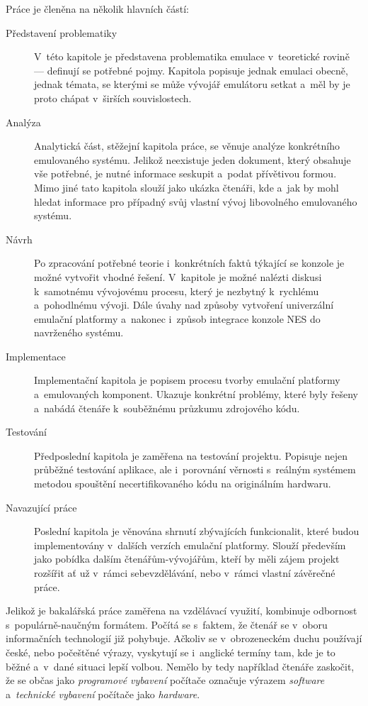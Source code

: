 Práce je členěna na několik hlavních částí:
\begin{description}
	\item[Představení problematiky] V~této kapitole je představena problematika emulace v~teoretické rovině --- definují se potřebné pojmy. Kapitola popisuje jednak emulaci obecně, jednak témata, se kterými se může vývojář emulátoru setkat a~měl by je proto chápat v~širších souvislostech.
	\item[Analýza] Analytická část, stěžejní kapitola práce, se věnuje analýze konkrétního emulovaného systému. Jelikož neexistuje jeden dokument, který obsahuje vše potřebné, je nutné informace seskupit a~podat přívětivou formou. Mimo jiné tato kapitola slouží jako ukázka čtenáři, kde a~jak by mohl hledat informace pro případný svůj vlastní vývoj libovolného emulovaného systému.
	\item[Návrh] Po zpracování potřebné teorie i~konkrétních faktů týkající se konzole je možné vytvořit vhodné řešení. V~kapitole je možné nalézti diskusi k~samotnému vývojovému procesu, který je nezbytný k~rychlému a~pohodlnému vývoji. Dále úvahy nad způsoby vytvoření univerzální emulační platformy a~nakonec i~způsob integrace konzole NES do navrženého systému.
	\item[Implementace] Implementační kapitola je popisem procesu tvorby emulační platformy a~emulovaných komponent. Ukazuje konkrétní problémy, které byly řešeny a~nabádá čtenáře k~souběžnému průzkumu zdrojového kódu.
	\item[Testování] Předposlední kapitola je zaměřena na testování projektu. Popisuje nejen průběžné testování aplikace, ale i~porovnání věrnosti s~reálným systémem metodou spouštění necertifikovaného kódu na originálním hardwaru.
	\item[Navazující práce] Poslední kapitola je věnována shrnutí zbývajících funkcionalit, které budou implementovány v~dalších verzích emulační platformy. Slouží především jako pobídka dalším čtenářům-vývojářům, kteří by měli zájem projekt rozšířit ať už v~rámci sebevzdělávání, nebo v~rámci vlastní závěrečné práce.
\end{description}

\begin{note*}[Terminologie]
	Jelikož je bakalářská práce zaměřena na vzdělávací využití, kombinuje odbornost s~populárně-naučným formátem. Počítá se s~faktem, že čtenář se v~oboru informačních technologií již pohybuje. Ačkoliv se v~obrozeneckém duchu používají české, nebo počeštěné výrazy, vyskytují se i~anglické termíny tam, kde je to běžné a~v~dané situaci lepší volbou. Nemělo by tedy například čtenáře zaskočit, že se občas jako \emph{programové vybavení} počítače označuje výrazem \emph{software} a~\emph{technické vybavení} počítače jako \emph{hardware}.	
\end{note*}

